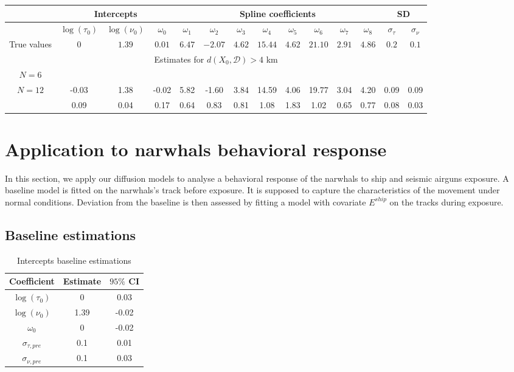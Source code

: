 \documentclass[11pt]{article}
\newcommand {\1}{\mathbb{1}}
\theoremstyle{definition}
\theoremstyle{remark}
\theoremstyle{remark}
\begin{document}
\begin{table}[H]
	\centering
		\begin{tabular}{|c|c|c|c|c|c|c|c|c|c|c|c|c|c|}
		\hline
		&\multicolumn{3}{|c|}{Intercepts} & \multicolumn{8}{|c|}{Spline coefficients} & \multicolumn{2}{|c|}{SD} \\
		\hline
		&$\log(\tau_0)$ & $\log(\nu_0)$ & $\omega_0$ & $\omega_1$ & $\omega_2$ & $\omega_3$ & $\omega_4$  & $\omega_5$ & $\omega_6$ & $\omega_7$ & $\omega_8$ & $\sigma_{\tau}$ & $\sigma_{\nu}$ \\
		\hline 
		 True values & $0$ & $1.39$ & $0.01$ & $6.47$ & $-2.07$ & $4.62$ & $15.44$ & $4.62$ & $21.10$ & $2.91$ & $4.86$ & $0.2$ & $0.1$ \\
		\hline
			\multicolumn{14}{|c|}{Estimates for $d(X_0,\mathcal{D}) > 4$ km} \\
			\hline
	\multirow{2}{4em}{$N=6$} & & & & & & & & & & & & &\\
	& & & & & & & & & & & & & \\
	\hline
	\multirow{2}{4em}{$N=12$} & -0.03 & 1.38 & -0.02
	&5.82&-1.60 & 3.84 & 14.59 &4.06 & 19.77 & 3.04 & 4.20 & 0.09& 
	0.09\\
	& 0.09 & 0.04 & 0.17 & 0.64 &0.83 &0.81 & 1.08 & 1.83 & 1.02 &0.65 &0.77 &
	0.08 & 0.03  \\
	\hline	
\end{tabular}
\end{table}



\section{Application to narwhals behavioral response}


In this section, we apply our diffusion models to analyse a behavioral response of the narwhals to ship and seismic airguns exposure.
A baseline model is fitted on the narwhals's track before exposure. It is supposed to capture the characteristics of the movement under normal conditions. Deviation from the baseline is then assessed by fitting a model with covariate $E^{ship}$ on the tracks during exposure.


\subsection{Baseline estimations}

\begin{table}[H]
	\centering
	\begin{tabular}{|c|c|c|}
		\hline
		Coefficient   & Estimate  & $95\%$ CI \\
		\hline
		$\log(\tau_0)$   & 0     & 0.03 \\
		$\log(\nu_0)$  & 1.39  & -0.02 \\
		$\omega_0$     & 0     & -0.02 \\
		$\sigma_{\tau,pre}$   & 0.1   & 0.01  \\
		$\sigma_{\nu,pre}$    & 0.1   & 0.03  \\
		\hline
	\end{tabular}
	\caption{Intercepts baseline estimations}
	\label{table: baseline estilations}
\end{table}
\end{document}
